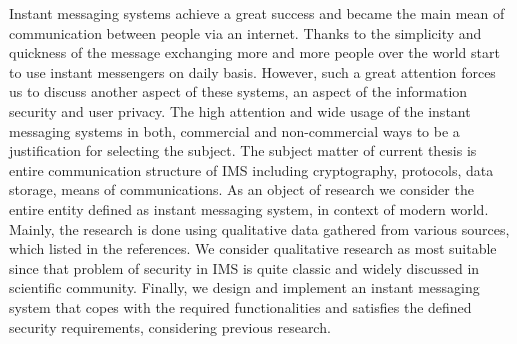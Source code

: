 Instant messaging systems achieve a great success and became the main mean of communication
between people via an internet.
Thanks to the simplicity and quickness of the message exchanging more and more people over the world start to use
instant messengers on daily basis.
However, such a great attention forces us to discuss another aspect of these systems, an aspect of the
information security and user privacy.
The high attention and wide usage of the instant messaging systems in both, commercial and non-commercial ways to be
a justification for selecting the subject.
The subject matter of current thesis is entire communication structure of IMS including cryptography, protocols,
data storage, means of communications.
As an object of research we consider the entire entity defined as instant messaging system, in context of modern world.
Mainly, the research is done using qualitative data gathered from various sources, which listed in the references.
We consider qualitative research as most suitable since that problem of security in IMS is quite classic and widely
discussed in scientific community.
Finally, we design and implement an instant messaging system that copes with the required functionalities and satisfies
the defined security requirements, considering previous research.